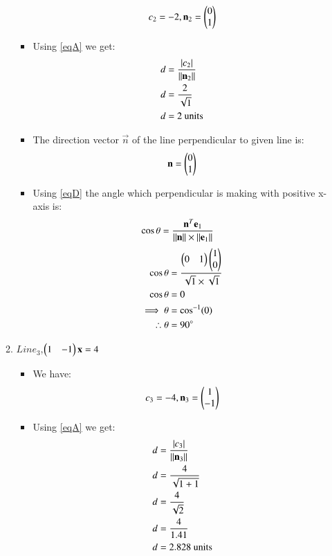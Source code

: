 \documentclass[journal,12pt,twocolumn]{IEEEtran}
\begin{document}
\begin{enumerate}
\begin{enumerate}[label=\alph*.]
\begin{itemize}
\begin{align}
 c\textsubscript{2}=-2 ,{\mathbf{n\textsubscript{2}}}=\begin{pmatrix}0\\1\end{pmatrix}   
\end{align}
\item Using \eqref{eqA} we get:
\begin{align}
d&=\frac { \left| c\textsubscript{2} \right| }{\lVert\mathbf{n\textsubscript{2}}\rVert}
\\
d&=\frac{2}{\sqrt{1}} 
\\
d&=2 \text{ units}
\end{align}
\item The direction vector $\vec{n}$ of the line perpendicular to given line is: 
\begin{align}
    \mathbf{n}=\begin{pmatrix}0\\1\end{pmatrix}
\end{align}
\item Using \eqref{eqD} the angle which perpendicular is making with positive x-axis is:
\begin{align}
   \cos\theta &= \frac{\mathbf{n}^T\mathbf{e\textsubscript{1}}}{\lVert\mathbf{n}\rVert\times\lVert\mathbf{e\textsubscript{1}}\rVert}
    \end{align}
    \begin{align}
   \cos\theta &= \frac{\begin{pmatrix}0&1\end{pmatrix}\begin{pmatrix}1\\0\end{pmatrix}}{\sqrt{1}\times\sqrt{1}}
    \\
 \cos\theta&= 0
 \\
 \implies \theta&=\cos^{-1}(0)
 \\
 \therefore  \theta&=90\degree
\end{align}
\end{itemize}
\item 
$Line_3$,$\begin{pmatrix}1&-1\end{pmatrix}\mathbf{x} =4$
\begin{itemize}
\item We have:
\begin{align}
 c\textsubscript{3}= -4 ,{\mathbf{n\textsubscript{3}}}=\begin{pmatrix}1\\-1\end{pmatrix}   
\end{align}
\item Using \eqref{eqA} we get:
\begin{align}
d&=\frac { \left| c\textsubscript{3}\right| }{\norm{\vec{n\textsubscript{3}}}}
\\
d&=\frac{4}{\sqrt{1+1}} 
\\
d&=\frac{4}{\sqrt{2}}
\\
d&=\frac{4}{1.41}
\\
d&=2.828 \text{ units}

\end{align}
\end{itemize}
\end{enumerate}
\end{enumerate}
\end{document}
